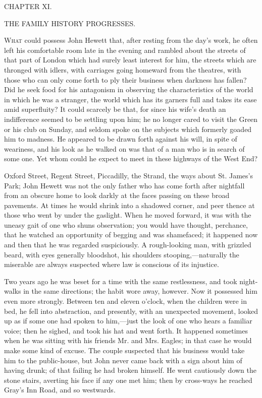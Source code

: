 {}

{CHAPTER XI.}

THE FAMILY HISTORY PROGRESSES.

\textsc{What} could possess John Hewett that, after resting from the
day's work, he often left his comfortable room late in the evening and
rambled about the streets of that part of London which had surely least
interest for him, the streets which are thronged with idlers, with
carriages going homeward from the theatres, with those who can only come
forth to ply their business when darkness has fallen? Did he seek food
for his antagonism in observing the characteristics of the world in
which he was a stranger, the world which has its garners full and takes
its ease amid superfluity? It could scarcely be that, for since his
wife's death an indifference seemed to be settling upon him; he no
longer cared to visit the Green or his club on Sunday, and seldom spoke
on the subjects which formerly goaded {}him to madness. He appeared to
be drawn forth against his will, in spite of weariness, and his look as
he walked on was that of a man who is in search of some one. Yet whom
could he expect to meet in these highways of the West End?

Oxford Street, Regent Street, Piccadilly, the Strand, the ways about St.
James's Park; John Hewett was not the only father who has come forth
after nightfall from an obscure home to look darkly at the faces passing
on these broad pavements. At times he would shrink into a shadowed
corner, and peer thence at those who went by under the gaslight. When he
moved forward, it was with the uneasy gait of one who shuns observation;
you would have thought, perchance, that he watched an opportunity of
begging and was shamefaced; it happened now and then that he was
regarded suspiciously. A rough-looking man, with grizzled beard, with
eyes generally bloodshot, his shoulders stooping,---naturally the
miserable are always suspected where law is conscious of its injustice.

{}Two years ago he was beset for a time with the same restlessness, and
took night-walks in the same directions; the habit wore away, however.
Now it possessed him even more strongly. Between ten and eleven o'clock,
when the children were in bed, he fell into abstraction, and presently,
with an unexpected movement, looked up as if some one had spoken to
him,---just the look of one who hears a familiar voice; then he sighed,
and took his hat and went forth. It happened sometimes when he was
sitting with his friends Mr. and Mrs. Eagles; in that case he would make
some kind of excuse. The couple suspected that his business would take
him to the public-house, but John never came back with a sign about him
of having drunk; of that failing he had broken himself. He went
cautiously down the stone stairs, averting his face if any one met him;
then by cross-ways he reached Gray's Inn Road, and so westwards.

